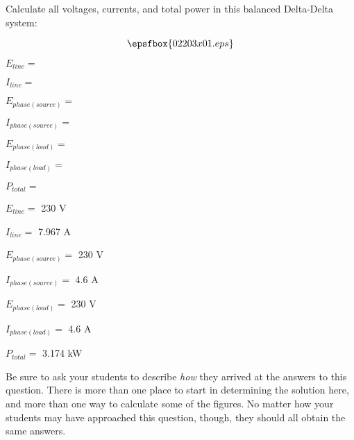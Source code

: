 

Calculate all voltages, currents, and total power in this balanced Delta-Delta system:

$$\epsfbox{02203x01.eps}$$

\medskip
\item{} $E_{line} =$
\item{} $I_{line} =$
\item{} $E_{phase(source)} =$
\item{} $I_{phase(source)} =$
\item{} $E_{phase(load)} =$
\item{} $I_{phase(load)} =$
\item{} $P_{total} =$
\medskip







\medskip
\item{} $E_{line} =$ 230 V
\item{} $I_{line} =$ 7.967 A
\item{} $E_{phase(source)} =$ 230 V
\item{} $I_{phase(source)} =$ 4.6 A
\item{} $E_{phase(load)} =$ 230 V
\item{} $I_{phase(load)} =$ 4.6 A
\item{} $P_{total} =$ 3.174 kW
\medskip







Be sure to ask your students to describe {\it how} they arrived at the answers to this question.  There is more than one place to start in determining the solution here, and more than one way to calculate some of the figures.  No matter how your students may have approached this question, though, they should all obtain the same answers.





